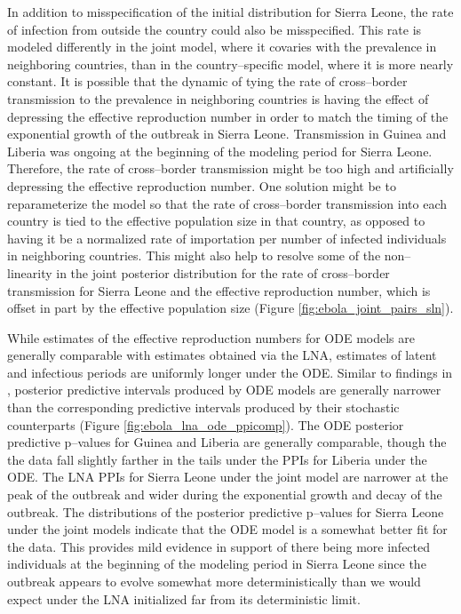 In addition to misspecification of the initial distribution for Sierra Leone, the rate of infection from outside the country could also be misspecified. This rate is modeled differently in the joint model, where it covaries with the prevalence in neighboring countries, than in the country--specific model, where it is more nearly constant. It is possible that the dynamic of tying the rate of cross--border transmission to the prevalence in neighboring countries is having the effect of depressing the effective reproduction number in order to match the timing of the exponential growth of the outbreak in Sierra Leone. Transmission in Guinea and Liberia was ongoing at the beginning of the modeling period for Sierra Leone. Therefore, the rate of cross--border transmission might be too high and artificially depressing the effective reproduction number. One solution might be to reparameterize the model so that the rate of cross--border transmission into each country is tied to the effective population size in that country, as opposed to having it be a normalized rate of importation per number of infected individuals in neighboring countries. This might also help to resolve some of the non--linearity in the joint posterior distribution for the rate of cross--border transmission for Sierra Leone and the effective reproduction number, which is offset in part by the effective population size (Figure \ref{fig:ebola_joint_pairs_sln}). 

While estimates of the effective reproduction numbers for ODE models are generally comparable with estimates obtained via the LNA, estimates of latent and infectious periods are uniformly longer under the ODE. Similar to findings in \cite{king2015avoidable}, posterior predictive intervals produced by ODE models are generally narrower than the corresponding predictive intervals produced by their stochastic counterparts (Figure \ref{fig:ebola_lna_ode_ppicomp}). The ODE posterior predictive p--values for Guinea and Liberia are generally comparable, though the the data fall slightly farther in the tails under the PPIs for Liberia under the ODE. The LNA PPIs for Sierra Leone under the joint model are narrower at the peak of the outbreak and wider during the exponential growth and decay of the outbreak. The distributions of the posterior predictive p--values for Sierra Leone under the joint models indicate that the ODE model is a somewhat better fit for the data. This provides mild evidence in support of there being more infected individuals at the beginning of the modeling period in Sierra Leone since the outbreak appears to evolve somewhat more deterministically than we would expect under the LNA initialized far from its deterministic limit. 

